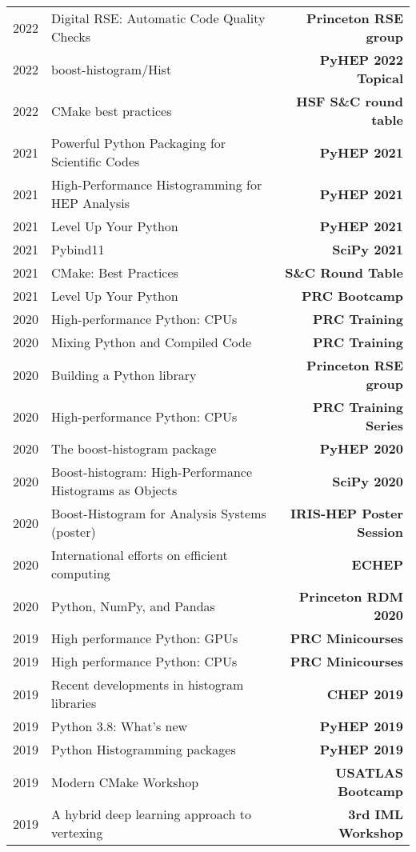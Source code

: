\documentclass[10pt,letterpaper]{moderncv}
\begin{document}
\begin{tabularx}{\textwidth}{p{.33in}X>{\bfseries}r}
    2022 & Digital RSE: Automatic Code Quality Checks & Princeton RSE group \\
    2022 & boost-histogram/Hist & PyHEP 2022 Topical \\
    2022 & CMake best practices & HSF S\&C round table \\
	2021 & Powerful Python Packaging for Scientific Codes & PyHEP 2021 \\
	2021 & High-Performance Histogramming for HEP Analysis & PyHEP 2021 \\
	2021 & Level Up Your Python & PyHEP 2021 \\
	2021 & Pybind11 & SciPy 2021 \\
    2021 & CMake: Best Practices & S\&C Round Table \\
    2021 & Level Up Your Python & PRC Bootcamp \\
    2020 & High-performance Python: CPUs & PRC Training \\
    2020 & Mixing Python and Compiled Code & PRC Training \\
    2020 & Building a Python library & Princeton RSE group \\
    2020 & High-performance Python: CPUs & PRC Training Series \\
    2020 & The boost-histogram package & PyHEP 2020 \\
    2020 & Boost-histogram: High-Performance Histograms as Objects & SciPy 2020 \\
    2020 & Boost-Histogram for Analysis Systems (poster) & IRIS-HEP Poster Session \\
    2020 & International efforts on efficient computing & ECHEP \\
    2020 & Python, NumPy, and Pandas & Princeton RDM 2020 \\
    2019 & High performance Python: GPUs & PRC Minicourses \\
    2019 & High performance Python: CPUs & PRC Minicourses \\
    2019 & Recent developments in histogram libraries  & CHEP 2019 \\
    2019 & Python 3.8: What's new & PyHEP 2019 \\
    2019 & Python Histogramming packages & PyHEP 2019\\
    2019 & Modern CMake Workshop & USATLAS Bootcamp \\
    2019 & A hybrid deep learning approach to vertexing & 3rd IML Workshop \\

\end{tabularx}
\end{document}

